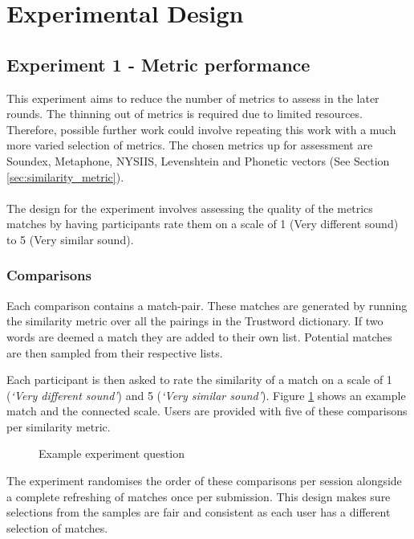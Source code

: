 \section{Experimental Design}

\subsection{Experiment 1 - Metric performance}
This experiment aims to reduce the number of metrics to assess in the later rounds. The thinning out of metrics is required due to limited resources. Therefore, possible further work could involve repeating this work with a much more varied selection of metrics. The chosen metrics up for assessment are Soundex, Metaphone, NYSIIS, Levenshtein and Phonetic vectors (See Section \ref{sec:similarity_metric}).
\\\\
The design for the experiment involves assessing the quality of the metrics matches by having participants rate them on a scale of 1 (Very different sound) to 5 (Very similar sound).

\subsubsection*{Comparisons}
Each comparison contains a match-pair. These matches are generated by running the similarity metric over all the pairings in the Trustword dictionary. If two words are deemed a match they are added to their own list. Potential matches are then sampled from their respective lists.

Each participant is then asked to rate the similarity of a match on a scale of 1 (\textit{`Very different sound'}) and 5 (\textit{`Very similar sound'}). Figure \ref{fig:phoneticMatch} shows an example match and the connected scale. Users are provided with five of these comparisons per similarity metric.

\begin{figure}[h!]
    \centering
    \begin{adjustbox}{width=0.5\textwidth,center}
    \end{adjustbox}
    \caption{Example experiment question}
    \label{fig:phoneticMatch}
\end{figure}

The experiment randomises the order of these comparisons per session alongside a complete refreshing of matches once per submission. This design makes sure selections from the samples are fair and consistent as each user has a different selection of matches.

